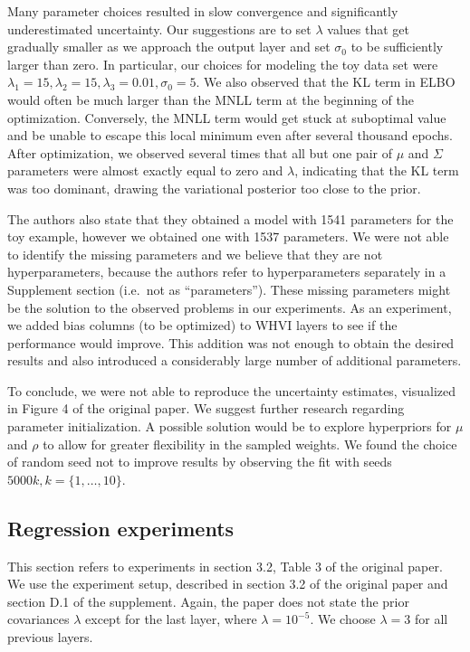 \documentclass[11pt, twocolumn]{article}
\begin{document}
    Many parameter choices resulted in slow convergence and significantly underestimated uncertainty.
    Our suggestions are to set $\lambda$ values that get gradually smaller as we approach the output layer and set $\sigma_0$ to be sufficiently larger than zero.
    In particular, our choices for modeling the toy data set were $\lambda_1=15, \lambda_2=15,\lambda_3=0.01, \sigma_0=5$.
    We also observed that the KL term in ELBO would often be much larger than the MNLL term at the beginning of the optimization. Conversely, the MNLL term would get stuck at suboptimal value and be unable to escape this local minimum even after several thousand epochs.
    After optimization, we observed several times that all but one pair of $\mu$ and $\Sigma$ parameters were almost exactly equal to zero and $\lambda$, indicating that the KL term was too dominant, drawing the variational posterior too close to the prior.

    The authors also state that they obtained a model with 1541 parameters for the toy example, however we obtained one with 1537 parameters.
    We were not able to identify the missing parameters and we believe that they are not hyperparameters, because the authors refer to hyperparameters separately in a Supplement section (i.e.\ not as ``parameters'').
    These missing parameters might be the solution to the observed problems in our experiments.
    As an experiment, we added bias columns (to be optimized) to WHVI layers to see if the performance would improve.
    This addition was not enough to obtain the desired results and also introduced a considerably large number of additional parameters.

    To conclude, we were not able to reproduce the uncertainty estimates, visualized in Figure 4 of the original paper.
    We suggest further research regarding parameter initialization.
    A possible solution would be to explore hyperpriors for $\mu$ and $\rho$ to allow for greater flexibility in the sampled weights.
    We found the choice of random seed not to improve results by observing the fit with seeds $5000k, k = \{1, \dots, 10\}$.

    \subsection{Regression experiments}
    This section refers to experiments in section 3.2, Table 3 of the original paper.
    We use the experiment setup, described in section 3.2 of the original paper and section D.1 of the supplement.
    Again, the paper does not state the prior covariances $\lambda$ except for the last layer, where $\lambda = 10^{-5}$.
    We choose $\lambda = 3$ for all previous layers.
\end{document}
